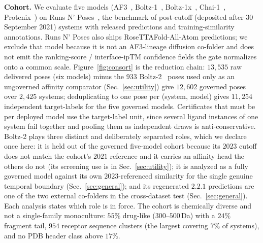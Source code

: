 \documentclass[10pt]{article}
\begin{document}
\textbf{Cohort.} We evaluate five models
(AF3~\citep{af3}, Boltz-1~\citep{boltz1}, Boltz-1x~\citep{boltz1x}, Chai-1~\citep{chai}, Protenix~\citep{protenix}) on Runs
N' Poses~\citep{rnp}, the benchmark of post-cutoff (deposited after 30 September 2021) systems with released
predictions and training-similarity annotations. Runs N' Poses also ships RoseTTAFold-All-Atom predictions;
we exclude that model because it is not an AF3-lineage diffusion co-folder and does not emit the
ranking-score / interface-ipTM confidence fields the gate normalizes onto a common scale. Figure~\ref{fig:consort} is the reduction chain: $13{,}535$ raw delivered poses
(six models) minus the $933$ Boltz-2~\citep{boltz2} poses used only as an ungoverned affinity comparator
(Sec.~\ref{sec:utility}) give $12{,}602$ governed poses over $2{,}425$ systems; deduplicating to one pose
per (system, model) gives $11{,}254$ independent target-labels for the five governed models. Certificates
that must be per deployed model use the target-label unit, since several ligand instances of one system
fail together and pooling them as independent draws is anti-conservative. Boltz-2 plays three distinct and
deliberately separated roles, which we declare once here: it is held out of the governed five-model cohort
because its $2023$ cutoff does not match the cohort's $2021$ reference and it carries an affinity head the
others do not (its screening use is in Sec.~\ref{sec:utility}); it is analyzed as a fully governed model
against its own $2023$-referenced similarity for the single genuine temporal boundary
(Sec.~\ref{sec:general}); and its regenerated $2.2.1$ predictions are one of the two external co-folders in
the cross-dataset test (Sec.~\ref{sec:general}). Each analysis states which role is in force. The cohort is chemically diverse
and not a single-family monoculture: $55\%$ drug-like ($300$--$500$\,Da) with a $24\%$ fragment tail,
$954$ receptor sequence clusters (the largest covering $7\%$ of systems), and no PDB header class above
$17\%$.
\end{document}
